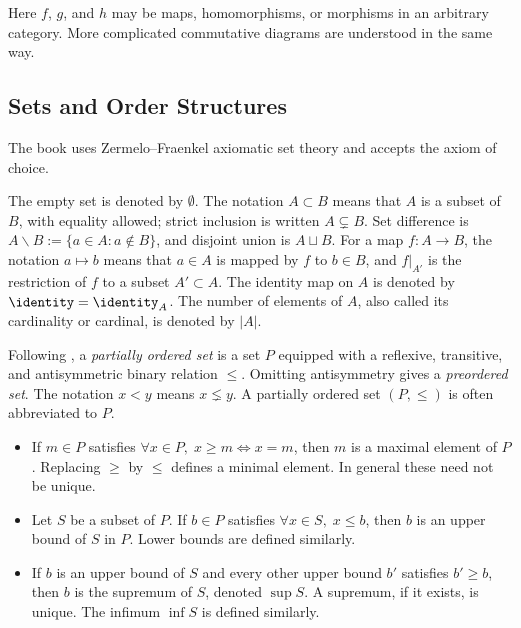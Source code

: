 Here $f$, $g$, and $h$ may be maps, homomorphisms, or morphisms in an arbitrary category. More complicated commutative diagrams are understood in the same way.

\subsection*{Sets and Order Structures}

The book uses Zermelo--Fraenkel axiomatic set theory and accepts the axiom of choice.

The empty set is denoted by $\emptyset$. The notation $A\subset B$ means that $A$ is a subset of $B$, with equality allowed; strict inclusion is written $A\subsetneq B$. Set difference is $A\smallsetminus B:=\{a\in A:a\notin B\}$, and disjoint union is $A\sqcup B$. For a map $f:A\to B$, the notation $a\mapsto b$ means that $a\in A$ is mapped by $f$ to $b\in B$, and $f|_{A'}$ is the restriction of $f$ to a subset $A'\subset A$. The identity map on $A$ is denoted by $\identity=\identity_A$. The number of elements of $A$, also called its cardinality or cardinal, is denoted by $|A|$.

Following \cite[Definition~1.2.1]{Li1}, a \emph{partially ordered set}
is a set $P$ equipped with a reflexive, transitive, and antisymmetric binary relation $\leq$. Omitting antisymmetry gives a \emph{preordered set}. The notation $x<y$ means $x\lneq y$. A partially ordered set $(P,\leq)$ is often abbreviated to $P$.

\begin{itemize}
	\item If $m\in P$ satisfies $\forall x\in P,\;x\geq m\iff x=m$, then $m$ is a maximal element of $P$. Replacing $\geq$ by $\leq$ defines a minimal element. In general these need not be unique.
	\item Let $S$ be a subset of $P$. If $b\in P$ satisfies $\forall x\in S,\;x\leq b$, then $b$ is an upper bound of $S$ in $P$. Lower bounds are defined similarly.
	\item If $b$ is an upper bound of $S$ and every other upper bound $b'$ satisfies $b'\geq b$, then $b$ is the supremum of $S$, denoted $\sup S$. A supremum, if it exists, is unique. The infimum $\inf S$ is defined similarly.
\end{itemize}

